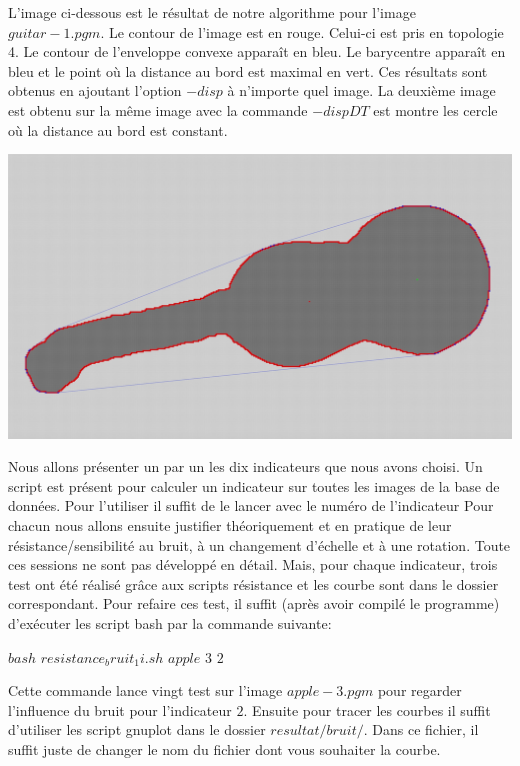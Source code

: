 \documentclass{report}
\begin{document}

L'image ci-dessous est le résultat de notre algorithme pour l'image $guitar-1.pgm$.
Le contour de l'image est en rouge. Celui-ci est pris en topologie 4. 
Le contour de l'enveloppe convexe apparaît en bleu. Le barycentre apparaît en bleu et le point
où la distance au bord est maximal en vert.
Ces résultats sont obtenus en ajoutant l'option $-disp$ à n'importe quel image.
La deuxième image est obtenu sur la même image avec la commande $-dispDT$ est montre les cercle
où la distance au bord est constant.
\begin{center}
\includegraphics[scale=0.2]{guitar.jpg}
\end{center}

Nous allons présenter un par un les dix indicateurs que nous avons choisi.
Un script est présent pour calculer un indicateur sur toutes les images de la base de données.
Pour l'utiliser il suffit de le lancer avec le numéro de l'indicateur 
Pour chacun nous allons ensuite justifier théoriquement et en pratique de leur résistance/sensibilité au bruit, à un changement d'échelle et à une rotation. Toute ces sessions ne sont pas développé en détail. 
Mais, pour chaque indicateur, trois test ont été réalisé grâce aux scripts résistance et les courbe sont dans le dossier correspondant.
Pour refaire ces test, il suffit (après avoir compilé le programme) d'exécuter les script bash par la commande suivante:

\noindent $bash$ $resistance_bruit_1i.sh$  $apple$  $3$  $2$

Cette commande lance vingt test sur l'image $apple-3.pgm$ pour regarder l'influence du bruit pour l'indicateur $2$.
Ensuite pour tracer les courbes il suffit d'utiliser les script gnuplot dans le dossier $resultat/bruit/$.
Dans ce fichier, il suffit juste de changer le nom du fichier dont vous souhaiter la courbe.
\end{document}
